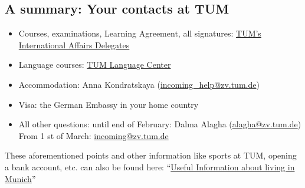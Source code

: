 \documentclass[oneside,final]{book}
\begin{document}
\subsection{A summary: Your contacts at TUM}
\begin{itemize}
  \item Courses, examinations, Learning Agreement, all signatures: \href{http://www.international.tum.de/en/internationalaffairs/}{TUM's International Affairs Delegates}
  \item Language courses: \href{http://www.sprachenzentrum.tum.de/en/languages/german-as-a-foreign-language/}{TUM Language Center}
  \item Accommodation: Anna Kondratskaya (\href{mailto:incoming\_help@zv.tum.de}{incoming\_help@zv.tum.de})
  \item Visa: the German Embassy in your home country
  \item All other questions: until end of February: Dalma Alagha (\href{mailto:alagha@zv.tum.de}{alagha@zv.tum.de}) \\
  From 1 st of March: \href{mailto:incoming@zv.tum.de}{incoming@zv.tum.de}
\end{itemize}

These aforementioned points and other information like sports at TUM, opening a bank account, etc. can
also be found here: “\href{http://www.international.tum.de/en/welcome-to-tum/international-exchange-students/exchange-students/}{Useful Information about living in Munich}”
\end{document}
